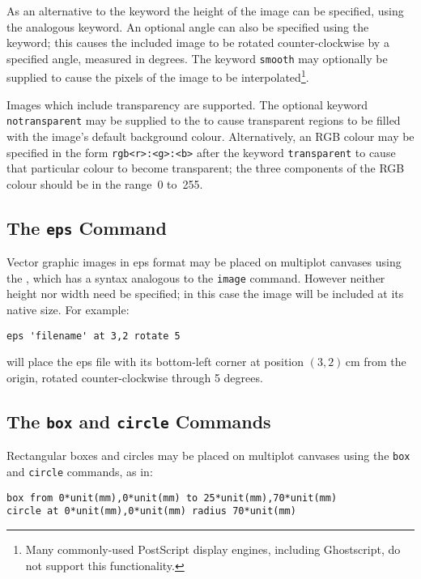 As an alternative to the  keyword the height of the image can be
specified, using the analogous  keyword.  An optional angle can
also be specified using the  keyword; this causes the included
image to be rotated counter-clockwise by a specified angle, measured in
degrees.  The keyword {\tt smooth} may optionally be supplied to cause the
pixels of the image to be interpolated\footnote{Many commonly-used PostScript
display engines, including Ghostscript, do not support this functionality.}.

Images which include transparency are supported. The optional keyword {\tt
notransparent} may be supplied to the  to cause transparent
regions to be filled with the image's default background colour. Alternatively,
an RGB colour may be specified in the form {\tt rgb<r>:<g>:<b>} after the
keyword {\tt transparent} to cause that particular colour to become
transparent; the three components of the RGB colour should be in the range~0
to~255.

\subsection{The {\tt eps} Command}

Vector graphic images in eps format may be placed on multiplot canvases
using the , which has a syntax analogous to the {\tt image}
command.  However neither height nor width need be specified; in this case the
image will be included at its native size.  For example:

\begin{verbatim}
eps 'filename' at 3,2 rotate 5
\end{verbatim}

\noindent will place the eps file with its bottom-left corner at position
$(3,2)$\,cm from the origin, rotated counter-clockwise through 5 degrees.

\subsection{The {\tt box} and {\tt circle} Commands}
\label{sec:rectangle}

Rectangular boxes and circles may be placed on multiplot canvases
using the {\tt box} and {\tt circle} commands, as
in:

\begin{verbatim}
box from 0*unit(mm),0*unit(mm) to 25*unit(mm),70*unit(mm)
circle at 0*unit(mm),0*unit(mm) radius 70*unit(mm)
\end{verbatim}

